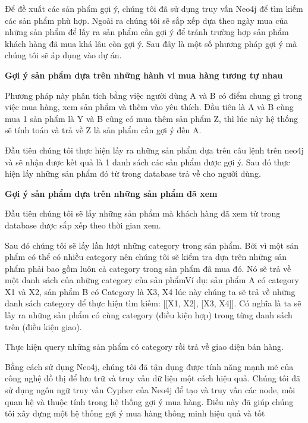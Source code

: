 \begin{enumerate}[a.]
Để đề xuất các sản phẩm gợi ý, chúng tôi đã sử dụng truy vấn Neo4j để tìm kiếm các sản phẩm phù hợp. Ngoài ra chúng tôi sẽ sắp xếp dựa theo ngày mua của những sản phẩm để lấy ra sản phẩm cần gợi ý để tránh trường hợp sản phẩm khách hàng đã mua khá lâu còn gợi ý. Sau đây là một số phương pháp gợi ý mà chúng tôi sẽ áp dụng vào dự án.

\textbf{Gợi ý sản phẩm dựa trên những hành vi mua hàng tương tự nhau}

Phương pháp này phân tích bằng việc người dùng A và B có điểm chung gì trong việc mua hàng, xem sản phẩm và thêm vào yêu thích. Đầu tiên là A và B cùng mua 1 sản phẩm là Y và B cũng có mua thêm sản phẩm Z, thì lúc này hệ thống sẽ tính toán và trả về Z là sản phẩm cần gợi ý đến A.

Đầu tiên chúng tôi thực hiện lấy ra những sản phẩm dựa trên câu lệnh trên neo4j và sẽ nhận được kết quả là 1 danh sách các sản phẩm được gợi ý. Sau đó thực hiện lấy những sản phẩm đó từ trong database trả về cho người dùng.

\textbf{Gợi ý sản phẩm dựa trên những sản phẩm đã xem}

Đầu tiên chúng tôi sẽ lấy những sản phẩm mà khách hàng đã xem từ trong database được sắp xếp theo thời gian xem.

Sau đó chúng tôi sẽ lấy lần lượt những category trong sản phẩm. Bởi vì một sản phẩm có thể có nhiều category nên chúng tôi sẽ kiểm tra dựa trên những sản phẩm phải bao gồm luôn cả category trong sản phẩm đã mua đó. Nó sẽ trả về một danh sách của những category của sản phẩmVí dụ: sản phẩm A có category X1 và X2, sản phẩm B có Category là X3, X4 lúc này chúng ta sẽ trả về những danh sách category để thực hiện tìm kiếm: [[X1, X2], [X3, X4]]. Có nghĩa là ta sẽ lấy ra những sản phẩm có cùng category (điều kiện hợp) trong từng danh sách trên (điều kiện giao).

Thực hiện query những sản phẩm có category rồi trả về giao diện bán hàng.

\end{enumerate}
Bằng cách sử dụng Neo4j, chúng tôi đã tận dụng được tính năng mạnh mẽ của công nghệ đồ thị để lưu trữ và truy vấn dữ liệu một cách hiệu quả. Chúng tôi đã sử dụng ngôn ngữ truy vấn Cypher của Neo4j để tạo và truy vấn các node, mối quan hệ và thuộc tính trong hệ thống gợi ý mua hàng. Điều này đã giúp chúng tôi xây dựng một hệ thống gợi ý mua hàng thông minh hiệu quả và tốt

